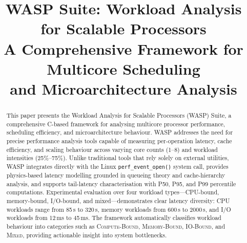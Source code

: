 \documentclass[conference]{IEEEtran}
\begin{document}
\title{WASP Suite: Workload Analysis for Scalable Processors\\
A Comprehensive Framework for Multicore Scheduling\\
and Microarchitecture Analysis}

\author{
\and {}
}

\maketitle

\begin{abstract}
This paper presents the Workload Analysis for Scalable Processors (WASP)
Suite, a
comprehensive C-based framework for analysing multicore processor performance,
scheduling efficiency, and microarchitecture behaviour.  WASP addresses the need
for precise performance analysis tools capable of measuring per-operation
latency, cache efficiency, and scaling behaviour across varying core counts
(1--8) and workload intensities (25\%--75\%).  Unlike traditional tools that
rely solely on external utilities, WASP integrates directly with the Linux
\texttt{perf\_event\_open()} system call, provides physics-based latency
modelling grounded in queueing theory and cache-hierarchy analysis, and
supports tail-latency characterisation with P50, P95, and P99 percentile
computations.  Experimental evaluation over four workload types—CPU-bound,
memory-bound, I/O-bound, and mixed—demonstrates clear latency diversity:
CPU workloads range from 85\,\textmu{}s to 320\,\textmu{}s, memory workloads
from 600\,\textmu{}s to 2000\,\textmu{}s, and I/O workloads from
12\,ms to 45\,ms.  The framework automatically classifies workload behaviour
into categories such as \textsc{Compute-Bound}, \textsc{Memory-Bound},
\textsc{IO-Bound}, and \textsc{Mixed}, providing actionable insight into
system bottlenecks.
\end{abstract}
\end{document}
